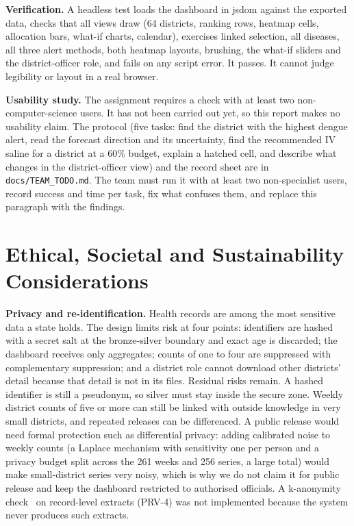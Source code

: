 \documentclass[conference]{IEEEtran}
\begin{document}
\textbf{Verification.} A headless test loads the dashboard in jsdom against the exported data, checks that all views draw (64 districts, ranking rows, heatmap cells, allocation bars, what-if charts, calendar), exercises linked selection, all diseases, all three alert methods, both heatmap layouts, brushing, the what-if sliders and the district-officer role, and fails on any script error. It passes. It cannot judge legibility or layout in a real browser.

\textbf{Usability study.} The assignment requires a check with at least two non-computer-science users. It has not been carried out yet, so this report makes no usability claim. The protocol (five tasks: find the district with the highest dengue alert, read the forecast direction and its uncertainty, find the recommended IV saline for a district at a 60\% budget, explain a hatched cell, and describe what changes in the district-officer view) and the record sheet are in \texttt{docs/TEAM\_TODO.md}. The team must run it with at least two non-specialist users, record success and time per task, fix what confuses them, and replace this paragraph with the findings.
\section{Ethical, Societal and Sustainability Considerations}\label{sec:ethics}
\textbf{Privacy and re-identification.} Health records are among the most sensitive data a state holds. The design limits risk at four points: identifiers are hashed with a secret salt at the bronze-silver boundary and exact age is discarded; the dashboard receives only aggregates; counts of one to four are suppressed with complementary suppression; and a district role cannot download other districts' detail because that detail is not in its files. Residual risks remain. A hashed identifier is still a pseudonym, so silver must stay inside the secure zone. Weekly district counts of five or more can still be linked with outside knowledge in very small districts, and repeated releases can be differenced. A public release would need formal protection such as differential privacy: adding calibrated noise to weekly counts (a Laplace mechanism with sensitivity one per person and a privacy budget split across the 261 weeks and 256 series, a large total) would make small-district series very noisy, which is why we do not claim it for public release and keep the dashboard restricted to authorised officials. A k-anonymity check~\cite{sweeney} on record-level extracts (PRV-4) was not implemented because the system never produces such extracts.
\end{document}
